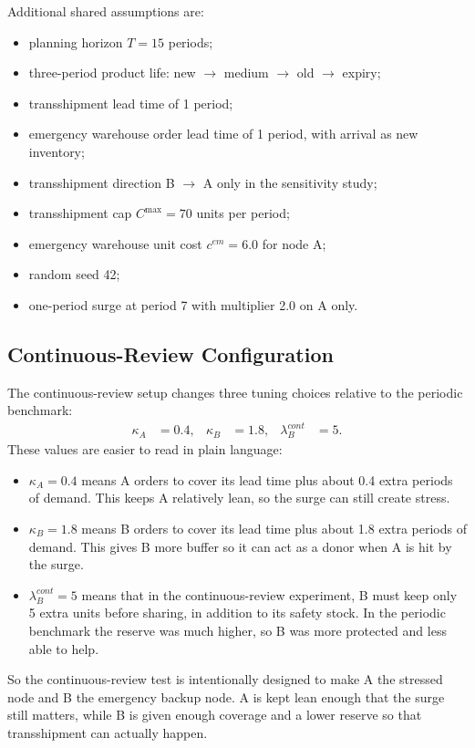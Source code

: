 \documentclass[11pt]{article}
\begin{document}
Additional shared assumptions are:
\begin{itemize}[leftmargin=2em]
\item planning horizon $T=15$ periods;
\item three-period product life: new $\rightarrow$ medium $\rightarrow$ old $\rightarrow$ expiry;
\item transshipment lead time of 1 period;
\item emergency warehouse order lead time of 1 period, with arrival as new inventory;
\item transshipment direction B $\rightarrow$ A only in the sensitivity study;
\item transshipment cap $C^{\max}=70$ units per period;
\item emergency warehouse unit cost $c^{em}=6.0$ for node A;
\item random seed 42;
\item one-period surge at period 7 with multiplier 2.0 on A only.
\end{itemize}

\subsection{Continuous-Review Configuration}
The continuous-review setup changes three tuning choices relative to the periodic benchmark:
\begin{align*}
\kappa_A &= 0.4, &
\kappa_B &= 1.8, &
\lambda_B^{cont} &= 5.
\end{align*}
These values are easier to read in plain language:
\begin{itemize}[leftmargin=2em]
\item $\kappa_A=0.4$ means A orders to cover its lead time plus about 0.4 extra periods of demand. This keeps A relatively lean, so the surge can still create stress.
\item $\kappa_B=1.8$ means B orders to cover its lead time plus about 1.8 extra periods of demand. This gives B more buffer so it can act as a donor when A is hit by the surge.
\item $\lambda_B^{cont}=5$ means that in the continuous-review experiment, B must keep only 5 extra units before sharing, in addition to its safety stock. In the periodic benchmark the reserve was much higher, so B was more protected and less able to help.
\end{itemize}
So the continuous-review test is intentionally designed to make A the stressed node and B the emergency backup node. A is kept lean enough that the surge still matters, while B is given enough coverage and a lower reserve so that transshipment can actually happen.
\end{document}
